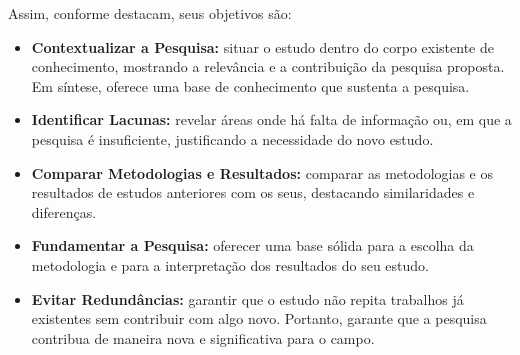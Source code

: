 Assim, conforme  destacam, seus objetivos são:
\begin{itemize}[itemsep=0pt, leftmargin=2.5cm]
    \item \textbf{Contextualizar a Pesquisa:} situar o estudo dentro do corpo existente de conhecimento, mostrando a relevância e a contribuição da pesquisa proposta. Em síntese, oferece uma base de conhecimento que sustenta a pesquisa.
    \item \textbf{Identificar Lacunas:} revelar áreas onde há falta de informação ou, em que a pesquisa é insuficiente, justificando a necessidade do novo estudo.
    \item \textbf{Comparar Metodologias e Resultados:} comparar as metodologias e os resultados de estudos anteriores com os seus, destacando similaridades e diferenças.
    \item \textbf{Fundamentar a Pesquisa:} oferecer uma base sólida para a escolha da metodologia e para a interpretação dos resultados do seu estudo.
    \item \textbf{Evitar Redundâncias:} garantir que o estudo não repita trabalhos já existentes sem contribuir com algo novo. Portanto, garante que a pesquisa contribua de maneira nova e significativa para o campo.
\end{itemize}

